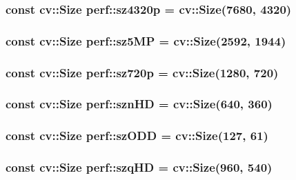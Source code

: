 \hypertarget{namespaceperf_a0abef7f9f2f4c44b279ef47a55c91bbd}{
\subsubsection[{sz4320p}]{\setlength{\rightskip}{0pt plus 5cm}const cv\-::\-Size perf\-::sz4320p = cv\-::\-Size(7680, 4320)}}\label{namespaceperf_a0abef7f9f2f4c44b279ef47a55c91bbd}
\hypertarget{namespaceperf_a6a094d73abcea734bcf1f546ff1abba6}{
\subsubsection[{sz5\-M\-P}]{\setlength{\rightskip}{0pt plus 5cm}const cv\-::\-Size perf\-::sz5\-M\-P = cv\-::\-Size(2592, 1944)}}\label{namespaceperf_a6a094d73abcea734bcf1f546ff1abba6}
\hypertarget{namespaceperf_a6ede89be4112c563e5f2c046f3cee64f}{
\subsubsection[{sz720p}]{\setlength{\rightskip}{0pt plus 5cm}const cv\-::\-Size perf\-::sz720p = cv\-::\-Size(1280, 720)}}\label{namespaceperf_a6ede89be4112c563e5f2c046f3cee64f}
\hypertarget{namespaceperf_af94d4bf8af282e3aa46c9d1f85630225}{
\subsubsection[{szn\-H\-D}]{\setlength{\rightskip}{0pt plus 5cm}const cv\-::\-Size perf\-::szn\-H\-D = cv\-::\-Size(640, 360)}}\label{namespaceperf_af94d4bf8af282e3aa46c9d1f85630225}
\hypertarget{namespaceperf_af52e6b9008d035b07afca749a825b143}{
\subsubsection[{sz\-O\-D\-D}]{\setlength{\rightskip}{0pt plus 5cm}const cv\-::\-Size perf\-::sz\-O\-D\-D = cv\-::\-Size(127, 61)}}\label{namespaceperf_af52e6b9008d035b07afca749a825b143}
\hypertarget{namespaceperf_a2aec1a98d3dfcd2d7f5546d61eb4e24c}{
\subsubsection[{szq\-H\-D}]{\setlength{\rightskip}{0pt plus 5cm}const cv\-::\-Size perf\-::szq\-H\-D = cv\-::\-Size(960, 540)}}\label{namespaceperf_a2aec1a98d3dfcd2d7f5546d61eb4e24c}
